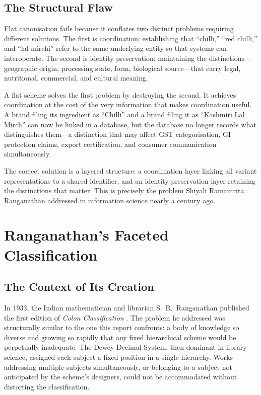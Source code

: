 \documentclass[12pt,a3paper]{article}
\begin{document}
\subsection{The Structural Flaw}

Flat canonisation fails because it conflates two distinct problems requiring different solutions. The first is coordination: establishing that ``chilli,'' ``red chilli,'' and ``lal mirchi'' refer to the same underlying entity so that systems can interoperate. The second is identity preservation: maintaining the distinctions---geographic origin, processing state, form, biological source---that carry legal, nutritional, commercial, and cultural meaning.

A flat scheme solves the first problem by destroying the second. It achieves coordination at the cost of the very information that makes coordination useful. A brand filing its ingredient as ``Chilli'' and a brand filing it as ``Kashmiri Lal Mirch'' can now be linked in a database, but the database no longer records what distinguishes them---a distinction that may affect GST categorisation, GI protection claims, export certification, and consumer communication simultaneously.

The correct solution is a layered structure: a coordination layer linking all variant representations to a shared identifier, and an identity-preservation layer retaining the distinctions that matter. This is precisely the problem Shiyali Ramamrita Ranganathan addressed in information science nearly a century ago.

\newpage


\section{Ranganathan's Faceted Classification}
\label{ch:ranganathan}

\subsection{The Context of Its Creation}

In 1933, the Indian mathematician and librarian S.\ R.\ Ranganathan published the first edition of \textit{Colon Classification} \cite{Ranganathan_CC_1933}. The problem he addressed was structurally similar to the one this report confronts: a body of knowledge so diverse and growing so rapidly that any fixed hierarchical scheme would be perpetually inadequate. The Dewey Decimal System, then dominant in library science, assigned each subject a fixed position in a single hierarchy. Works addressing multiple subjects simultaneously, or belonging to a subject not anticipated by the scheme's designers, could not be accommodated without distorting the classification.
\end{document}
